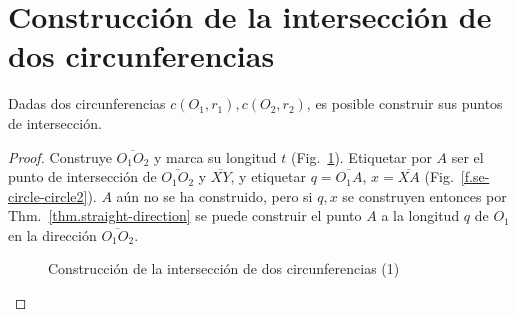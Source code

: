 \section{Construcción de la intersección de dos circunferencias}\label{s.two-circles}

\begin{theorem}
Dadas dos circunferencias $c(O_1,r_1), c(O_2,r_2)$, es posible construir sus puntos de intersección.
\end{theorem}

\begin{proof}
Construye $\overline{O_1O_2}$ y marca su longitud $t$ (Fig.~\ref{f.se-circle-circle1}).
Etiquetar por $A$ ser el punto de intersección de $\overline{O_1O_2}$ y $\overline{XY}$, y etiquetar $q=\overline{O_1A}$, $x=\overline{XA}$ (Fig.~\ref{f.se-circle-circle2}). $A$ aún no se ha construido, pero si $q,x$ se construyen entonces por Thm.~\ref{thm.straight-direction} se puede construir el punto $A$ a la longitud $q$ de $O_1$ en la dirección $\overline{O_1O_2}$.

\begin{figure}[t]
\begin{center}
\end{center}
\caption{Construcción de la intersección de dos circunferencias (1)}\label{f.se-circle-circle1}
\end{figure}


\end{proof}
